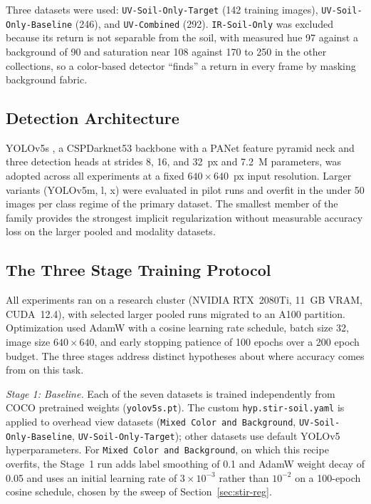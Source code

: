 ﻿\documentclass[journal]{IEEEtran}
\begin{document}
Three datasets were used: \texttt{UV-Soil-Only-Target} (142 training images), \texttt{UV-Soil-Only-Baseline} (246), and \texttt{UV-Combined} (292). \texttt{IR-Soil-Only} was excluded because its return is not separable from the soil, with measured hue 97 against a background of 90 and saturation near 108 against 170 to 250 in the other collections, so a color-based detector ``finds'' a return in every frame by masking background fabric.

\subsection{Detection Architecture}
YOLOv5s \cite{jocher2020yolov5}, a CSPDarknet53 backbone with a PANet feature pyramid neck and three detection heads at strides 8, 16, and 32~px and 7.2~M parameters, was adopted across all experiments at a fixed $640 \times 640$~px input resolution. Larger variants (YOLOv5m, l, x) were evaluated in pilot runs and overfit in the under 50 images per class regime of the primary dataset. The smallest member of the family provides the strongest implicit regularization without measurable accuracy loss on the larger pooled and modality datasets.

\subsection{The Three Stage Training Protocol}
All experiments ran on a research cluster (NVIDIA RTX~2080Ti, 11~GB VRAM, CUDA~12.4), with selected larger pooled runs migrated to an A100 partition. Optimization used AdamW with a cosine learning rate schedule, batch size 32, image size $640 \times 640$, and early stopping patience of 100 epochs over a 200 epoch budget. The three stages address distinct hypotheses about where accuracy comes from on this task.

\emph{Stage 1: Baseline.} Each of the seven datasets is trained independently from COCO pretrained weights (\texttt{yolov5s.pt}). The custom \texttt{hyp.stir-soil.yaml} is applied to overhead view datasets (\texttt{Mixed Color and Background}, \texttt{UV-Soil-Only-Baseline}, \texttt{UV-Soil-Only-Target}); other datasets use default YOLOv5 hyperparameters. For \texttt{Mixed Color and Background}, on which this recipe overfits, the Stage~1 run adds label smoothing of 0.1 and AdamW weight decay of 0.05 and uses an initial learning rate of $3 \times 10^{-3}$ rather than $10^{-2}$ on a 100-epoch cosine schedule, chosen by the sweep of Section~\ref{sec:stir-reg}.
\end{document}
